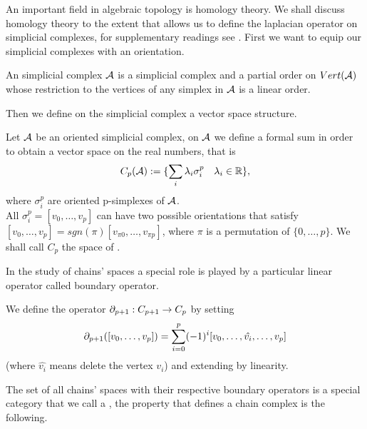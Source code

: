 \documentclass[../1.tex]{subfiles}
\begin{document}
    An important field in algebraic topology is homology theory. We shall discuss homology theory to the extent
    that allows us to define the laplacian operator on simplicial complexes, for supplementary readings see \cite{singerthorpe,hatcher}.
    First we want to equip our simplicial complexes with an orientation.

    \begin{defn}
        An  simplicial complex $\mathcal{A}$ is a simplicial complex and a partial order on $Vert(\mathcal{A})$ whose
        restriction to the vertices of any simplex in $\mathcal{A}$ is a linear order.
    \end{defn}

    Then we define on the simplicial complex a vector space structure.

    \begin{defn}
        Let $\mathcal{A}$ be an oriented simplicial complex, on $\mathcal{A}$ we define a formal sum in order
        to obtain a vector space on the real numbers, that is
        \[ C_p(\mathcal{A}) := \{ \sum_i \lambda_i \sigma_i^p \quad \lambda_i \in \mathbb{R} \},\]
        where $\sigma_i^p$ are oriented p-simplexes of $\mathcal{A}$.\\ %
        All $\sigma_i^p = [v_0,\dots,v_p]$ can have two possible orientations that satisfy
        $ [v_0,\dots,v_p] = sgn (\pi)[v_{\pi 0},\dots,v_{\pi p}]$,
        where $\pi$ is a permutation of $\{0,\dots,p\}$.  
        We shall call $C_p$ the space of .      
    \end{defn}

    In the study of chains' spaces a special role is played by a particular linear operator called
    boundary operator.

    \begin{defn}
        We define the  operator $\partial_{p+1} : C_{p+1} \to C_p$ by setting
        \[ \partial_{p+1}([v_0,\dots,v_p]) = \sum_{i=0}^p (-1)^i[v_0,\dots,\hat{v_i},\dots,v_p] \]
        (where $\hat{v_i}$ means delete the vertex $v_i$) and extending by linearity.
    \end{defn}

   The set of all chains' spaces with their respective boundary operators is a special category that we call a ,
   the property that defines a chain complex is the following.
\end{document}
